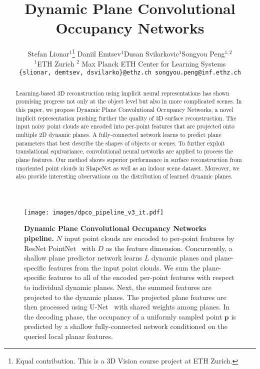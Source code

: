 \documentclass[10pt,twocolumn,letterpaper]{article}
\begin{document}
\title{Dynamic Plane Convolutional Occupancy Networks}

\author{Stefan Lionar$^{1}$\thanks{Equal contribution. This is a 3D Vision course project at ETH Zurich.}
\qquad Daniil Emtsev$^{1}$\footnotemark[1]
\qquad Dusan Svilarkovic$^{1}$\footnotemark[1]
\qquad Songyou Peng$^{1, 2}$\\
$^1$ETH Zurich \quad $^2$ Max Planck ETH Center for Learning Systems\\
{\tt\small \{slionar, demtsev, dsvilarko\}@ethz.ch \quad songyou.peng@inf.ethz.ch}
}

\maketitle


\begin{abstract}

Learning-based 3D reconstruction using implicit neural representations has shown promising progress not only at the object level but also in more complicated scenes. In this paper, we propose Dynamic Plane Convolutional Occupancy Networks, a novel implicit representation pushing further the quality of 3D surface reconstruction. The input noisy point clouds are encoded into per-point features that are projected onto multiple 2D dynamic planes. A fully-connected network learns to predict plane parameters that best describe the shapes of objects or scenes.
To further exploit translational equivariance, convolutional neural networks are applied to process the plane features. Our method shows superior performance in surface reconstruction from unoriented point clouds in ShapeNet as well as an indoor scene dataset. Moreover, we also provide interesting observations on the distribution of learned dynamic planes.

\end{abstract}

\begin{figure*}[ht!]
\centering
\texttt{[image: images/dpco\_pipeline\_v3\_it.pdf]}
\caption{\textbf{Dynamic Plane Convolutional Occupancy Networks pipeline.} $N$ input point clouds are encoded to per-point features by ResNet PointNet~\cite{pointnet} with $D$ as the feature dimension. Concurrently, a shallow plane predictor network learns $L$ dynamic planes and plane-specific features from the input point clouds. We sum the plane-specific features to all of the encoded per-point features with respect to individual dynamic planes. Next, the summed features are projected to the dynamic planes. The projected plane features are then processed using U-Net~\cite{unet} with shared weights among planes. In the decoding phase, the occupancy of a uniformly sampled point $\mathbf{p}$ is predicted by a shallow fully-connected network conditioned on the queried local planar features.}
\label{fig:method}
\end{figure*}
\end{document}
